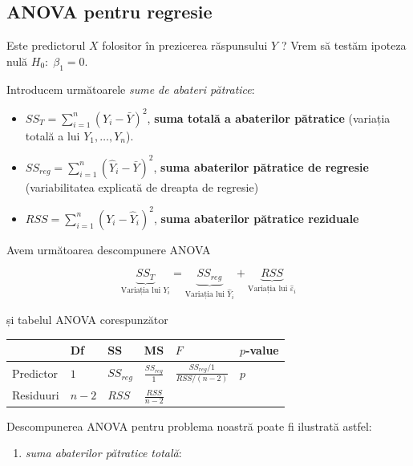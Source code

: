 \documentclass[]{article}
\providecommand{\tightlist}{%
  \setlength{\itemsep}{0pt}\setlength{\parskip}{0pt}}
\begin{document}
\subsection{ANOVA pentru regresie}\label{anova-pentru-regresie}

Este predictorul \(X\) folositor în prezicerea răspunsului \(Y\) ? Vrem
să testăm ipoteza nulă \(H_0:\;\beta_1=0\).

Introducem următoarele \emph{sume de abateri pătratice}:

\begin{itemize}
\item
  \(SS_T=\sum_{i=1}^n\left(Y_i-\bar Y\right)^2\), \textbf{suma totală a
  abaterilor pătratice} (variația totală a lui \(Y_1,\ldots,Y_n\)).
\item
  \(SS_{reg}=\sum_{i=1}^n\left(\hat Y_i-\bar Y\right)^2\), \textbf{suma
  abaterilor pătratice de regresie} (variabilitatea explicată de dreapta
  de regresie)
\item
  \(RSS=\sum_{i=1}^n\left(Y_i-\hat Y_i\right)^2\), \textbf{suma
  abaterilor pătratice reziduale}
\end{itemize}

Avem următoarea descompunere ANOVA

\[
\underbrace{SS_T}_{\text{Variația lui }Y_i} = \underbrace{SS_{reg}}_{\text{Variația lui }\hat Y_i} + \underbrace{RSS}_{\text{Variația lui }\hat \varepsilon_i} 
\]

și tabelul ANOVA corespunzător

\begin{longtable}[]{@{}llllll@{}}
\toprule
& Df & SS & MS & \(F\) & \(p\)-value\tabularnewline
\midrule
\endhead
Predictor & \(1\) & \(SS_{reg}\) & \(\frac{SS_{reg}}{1}\) &
\(\frac{SS_{reg}/1}{RSS/(n-2)}\) & \(p\)\tabularnewline
Residuuri & \(n - 2\) & \(RSS\) & \(\frac{RSS}{n-2}\) & &\tabularnewline
\bottomrule
\end{longtable}

Descompunerea ANOVA pentru problema noastră poate fi ilustrată astfel:

\begin{enumerate}
\def\labelenumi{\alph{enumi})}
\tightlist
\item
  \emph{suma abaterilor pătratice totală}:
\end{enumerate}
\end{document}
